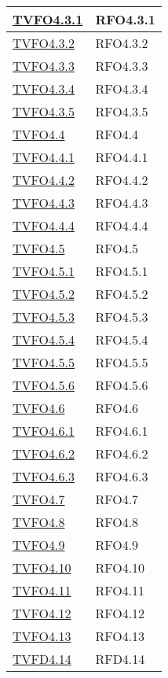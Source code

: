 \begin{longtable}{|>{\centering}m{5cm}|m{5cm}<{\centering}|}
\hyperlink{TVFO4.3.1}{TVFO4.3.1} & RFO4.3.1\\ \hline
\hyperlink{TVFO4.3.2}{TVFO4.3.2} & RFO4.3.2\\ \hline
\hyperlink{TVFO4.3.3}{TVFO4.3.3} & RFO4.3.3\\ \hline
\hyperlink{TVFO4.3.4}{TVFO4.3.4} & RFO4.3.4\\ \hline
\hyperlink{TVFO4.3.5}{TVFO4.3.5} & RFO4.3.5\\ \hline
\hyperlink{TVFO4.4}{TVFO4.4} & RFO4.4\\ \hline
\hyperlink{TVFO4.4.1}{TVFO4.4.1} & RFO4.4.1\\ \hline
\hyperlink{TVFO4.4.2}{TVFO4.4.2} & RFO4.4.2\\ \hline
\hyperlink{TVFO4.4.3}{TVFO4.4.3} & RFO4.4.3\\ \hline
\hyperlink{TVFO4.4.4}{TVFO4.4.4} & RFO4.4.4\\ \hline
\hyperlink{TVFO4.5}{TVFO4.5} & RFO4.5\\ \hline
\hyperlink{TVFO4.5.1}{TVFO4.5.1} & RFO4.5.1\\ \hline
\hyperlink{TVFO4.5.2}{TVFO4.5.2} & RFO4.5.2\\ \hline
\hyperlink{TVFO4.5.3}{TVFO4.5.3} & RFO4.5.3\\ \hline
\hyperlink{TVFO4.5.4}{TVFO4.5.4} & RFO4.5.4\\ \hline
\hyperlink{TVFO4.5.5}{TVFO4.5.5} & RFO4.5.5\\ \hline
\hyperlink{TVFO4.5.6}{TVFO4.5.6} & RFO4.5.6\\ \hline
\hyperlink{TVFO4.6}{TVFO4.6} & RFO4.6\\ \hline
\hyperlink{TVFO4.6.1}{TVFO4.6.1} & RFO4.6.1\\ \hline
\hyperlink{TVFO4.6.2}{TVFO4.6.2} & RFO4.6.2\\ \hline
\hyperlink{TVFO4.6.3}{TVFO4.6.3} & RFO4.6.3\\ \hline
\hyperlink{TVFO4.7}{TVFO4.7} & RFO4.7\\ \hline
\hyperlink{TVFO4.8}{TVFO4.8} & RFO4.8\\ \hline
\hyperlink{TVFO4.9}{TVFO4.9} & RFO4.9\\ \hline
\hyperlink{TVFO4.10}{TVFO4.10} & RFO4.10\\ \hline
\hyperlink{TVFO4.11}{TVFO4.11} & RFO4.11\\ \hline
\hyperlink{TVFO4.12}{TVFO4.12} & RFO4.12\\ \hline
\hyperlink{TVFO4.13}{TVFO4.13} & RFO4.13\\ \hline
\hyperlink{TVFD4.14}{TVFD4.14} & RFD4.14\\ \hline

\end{longtable}
